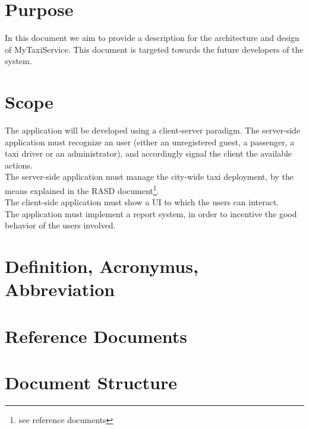 \section{Purpose}
In this document we aim to provide a description for the architecture and design of MyTaxiService.
This document is targeted towards the future developers of the system.

\section{Scope}
The application will be developed using a client-server paradigm.
The server-side application must recognize an user (either an unregistered guest, a passenger, a taxi driver or an administrator), 
and accordingly signal the client the available actions. \\
The server-side application must manage the city-wide taxi deployment, by the means explained in the RASD 
document\footnote{see reference documents}. \\ The client-side application must show a UI to which the users can interact. \\
The application must implement a report system, in order to incentive the good behavior of the users involved.

\section{Definition, Acronymus, Abbreviation}


\section{Reference Documents}

\section{Document Structure}
